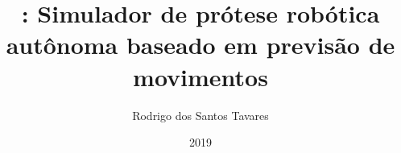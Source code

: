 \documentclass[
    12pt,       %
    oneside,    %
    a4paper,    %
%
    chapter=TITLE,	  	  %
%
    english,			  %
    brazil				  %
%
]{abntex2}
\title{\productname: Simulador de prótese robótica autônoma baseado em previsão de movimentos}
\author{Rodrigo dos Santos Tavares}
\date{2019}
\begin{document}


\imprimircapa{}

\imprimirfolhaderosto{}

\imprimirfolhadeaprovacao{}



\end{document}
